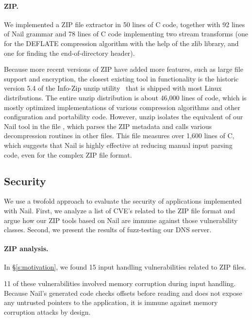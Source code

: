 \paragraph{ZIP.}

We implemented a ZIP file extractor in 50 lines of C code, together with
92 lines of Nail grammar and 78 lines of C code implementing two stream
transforms (one for the DEFLATE compression algorithm with the help of
the zlib library, and one for finding the end-of-directory header).

Because more recent versions of ZIP have added more features, such
as large file support and encryption, the closest existing tool
in functionality is the historic version 5.4 of the Info-Zip unzip
utility~\cite{infozip} that is shipped with most Linux distributions.
The entire unzip distribution is about 46,000 lines of code, which is
mostly optimized implementations of various compression algorithms and
other configuration and portability code.  However, unzip isolates the
equivalent of our Nail tool in the file , which parses the
ZIP metadata and calls various decompression routines in other files. This
file measures over 1,600 lines of C, which suggests that Nail is highly
effective at reducing manual input parsing code, even for the complex
ZIP file format.

\subsection{Security} 

We use a twofold approach to evaluate the security of applications
implemented with Nail. First, we analyze a list of CVE's related to the
ZIP file format and argue how our ZIP tools based on Nail are immune
against those vulnerability classes. Second, we present the results of
fuzz-testing our DNS server.

\paragraph{ZIP analysis.}

In \S\ref{s:motivation}, we found 15 input handling vulnerabilities
related to ZIP files.

11 of these vulnerabilities involved memory corruption during input handling.
Because Nail's generated code checks offsets before reading and does not
expose any untrusted pointers to the application, it is immune against
memory corruption attacks by design.

